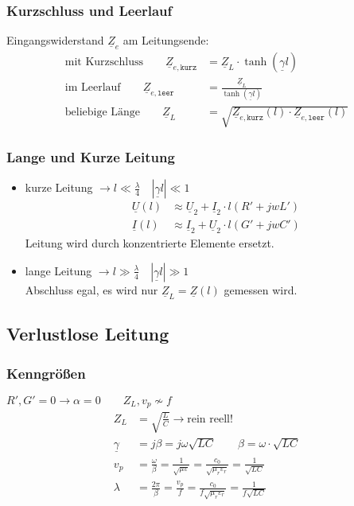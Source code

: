\subsubsection{Kurzschluss und Leerlauf}
Eingangswiderstand $ \underline{Z}_e $ am Leitungsende:
\begin{align*}
\text{mit Kurzschluss} \qquad \underline{Z}_{e,\texttt{kurz}} & = \underline{Z}_L \cdot \tanh(\underline{\gamma}l)\\
\text{im Leerlauf} \qquad 
\underline{Z}_{e,\texttt{leer}} & = \tfrac{\underline{Z}_L}{\tanh(\underline{\gamma}l)}\\
\text{beliebige Länge} \qquad \underline{Z}_L &=\sqrt{\underline{Z}_{e,\texttt{kurz}}(l)\cdot \underline{Z}_{e,\texttt{leer}}(l)}
\end{align*}
\subsubsection{Lange und Kurze Leitung}
\begin{itemize}
	\item kurze Leitung $\rightarrow l \ll \tfrac{\lambda}{4} \quad |\underline{\gamma}l| \ll 1 $
		\begin{align*}
			\underline{U}(l) &\approx \underline{U}_2 + \underline{I}_2 \cdot l (R' + jwL')\\
			\underline{I}(l) &\approx \underline{I}_2 + \underline{U}_2 \cdot l (G'+jwC')
		\end{align*}
	Leitung wird durch konzentrierte Elemente ersetzt.
	\item lange Leitung $\rightarrow l \gg \tfrac{\lambda}{4} \quad |\underline{\gamma}l| \gg 1$\\
	Abschluss egal, es wird nur $ \underline{Z}_L = \underline{Z}(l) $ gemessen wird.
\end{itemize}


\subsection{Verlustlose Leitung}
\subsubsection{Kenngrößen}
$ R', G' = 0 \rightarrow \alpha = 0 \qquad Z_L, v_p \nsim f$
\begin{align*}
	Z_L  & =  \sqrt{\frac{L}{C}} \rightarrow \text{rein reell!}                                                                         \\
    \underline{\gamma}  & = j \beta  = j \omega \sqrt{LC} \qquad \beta = \omega \cdot \sqrt{LC} \\
    v_p                & = \frac{\omega}{\beta} = \frac{1}{\sqrt{\mu\varepsilon}}= \frac{c_0}{\sqrt{\mu_r\varepsilon_r}} = \frac{1}{\sqrt{LC}} \\
    \lambda            & = \frac{2\pi}{\beta}= \frac{v_p}{f}= \frac{c_0}{f\sqrt{\mu_r\varepsilon_r}}=\frac{1}{f\sqrt{LC}}
\end{align*}
